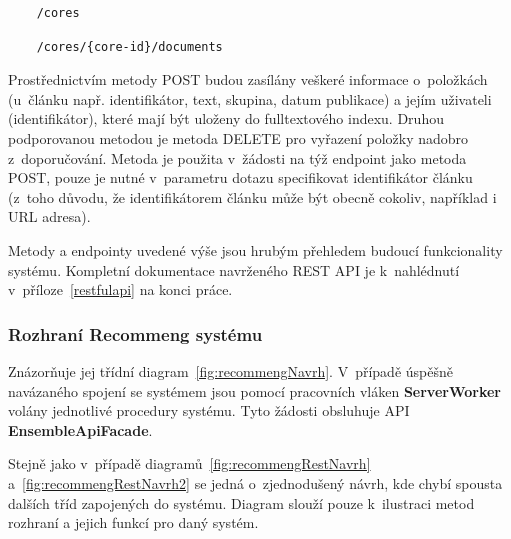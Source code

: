 \documentclass[thesis=M,czech]{FITthesis}[2014/05/07]
\begin{document}
\begin{verbatim}
	/cores
\end{verbatim}

\begin{verbatim}
	/cores/{core-id}/documents
\end{verbatim}

Prostřednictvím metody POST budou zasílány veškeré informace o~položkách (u~článku např. identifikátor, text, skupina, datum publikace) a jejím uživateli (identifikátor), které mají být uloženy do fulltextového indexu. Druhou podporovanou metodou je metoda DELETE pro vyřazení položky nadobro z~doporučování. Metoda je použita v~žádosti na týž endpoint jako metoda POST, pouze je nutné v~parametru dotazu specifikovat identifikátor článku (z~toho důvodu, že identifikátorem článku může být obecně cokoliv, například i URL adresa).

Metody a endpointy uvedené výše jsou hrubým přehledem budoucí funkcionality systému. Kompletní dokumentace navrženého REST API je k~nahlédnutí v~příloze~\ref{restfulapi} na konci práce.

\subsubsection{Rozhraní Recommeng systému}
Znázorňuje jej třídní diagram~\ref{fig:recommengNavrh}. V~případě úspěšně navázaného spojení se systémem jsou pomocí pracovních vláken \textbf{ServerWorker} volány jednotlivé procedury systému. Tyto žádosti obsluhuje API \textbf{EnsembleApiFacade}.

Stejně jako v~případě diagramů~\ref{fig:recommengRestNavrh} a~\ref{fig:recommengRestNavrh2} se jedná o~zjednodušený návrh, kde chybí spousta dalších tříd zapojených do systému. Diagram slouží pouze k~ilustraci metod rozhraní a jejich funkcí pro daný systém.
\end{document}
